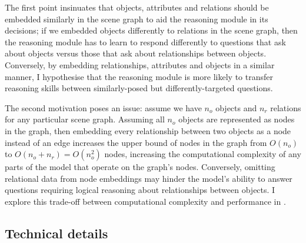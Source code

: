 The first point insinuates that objects, attributes and relations should be embedded similarly in the scene graph to aid the reasoning module in its decisions; if we embedded objects differently to relations in the scene graph, then the reasoning module has to learn to respond differently to questions that ask about objects versus those that ask about relationships between objects. Conversely, by embedding relationships, attributes and objects in a similar manner, I hypothesise that the reasoning module is more likely to transfer reasoning skills between similarly-posed but differently-targeted questions.

The second motivation poses an issue: assume we have \(n_o\) objects and \(n_r\) relations for any particular scene graph. Assuming all \(n_o\) objects are represented as nodes in the graph, then embedding every relationship between two objects as a node instead of an edge increases the upper bound of nodes in the graph from \(O(n_o)\) to \(O(n_o + n_r) = O(n_o^2)\) nodes, increasing the computational complexity of any parts of the model that operate on the graph's nodes. Conversely, omitting relational data from node embeddings may hinder the model's ability to answer questions requiring logical reasoning about relationships between objects. I explore this trade-off between computational complexity and performance in \sectionautorefname{ \ref{sec:ablation_studies}}.

\subsection{Technical details}
\label{sec:scene_graph_embedding_details}

